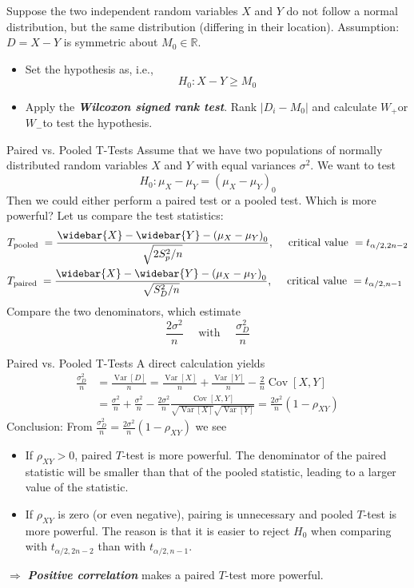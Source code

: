 \documentclass{beamer}
\newcommand{\bb}[1]{\textcolor{antiquefuchsia}{\textbf{\textit{#1}}}}
\begin{document}
\begin{frame}
Suppose the two independent random variables $X$ and $Y$ do not follow a normal distribution, but the same distribution (differing in their location).
Assumption: $D=X-Y$ is symmetric about $M_{0} \in \mathbb{R}$.
\begin{itemize}
\item Set the hypothesis as, i.e.,
$$
H_{0}: X-Y \geq M_{0}
$$
\item Apply the \bb{Wilcoxon signed rank test}. Rank $\left|D_{i}-M_{0}\right|$ and calculate $W_{+}$or $W_{-}$to test the hypothesis.
\end{itemize}
\end{frame}

\begin{frame}{Paired vs. Pooled T-Tests}
Assume that we have two populations of normally distributed random variables $X$ and $Y$ with equal variances $\sigma^{2}$. We want to test
$$
H_{0}: \mu_{X}-\mu_{Y}=\left(\mu_{X}-\mu_{Y}\right)_{0}
$$
Then we could either perform a paired test or a pooled test.
Which is more powerful? Let us compare the test statistics:
$$
\begin{aligned}
&T_{\text {pooled }}=\frac{\widebar{X}-\widebar{Y}-\left(\mu_{X}-\mu_{Y}\right)_{0}}{\sqrt{2 S_{p}^{2} / n}}, \quad \text { critical value }=t_{\alpha / 2,2 n-2} \\
&T_{\text {paired }}=\frac{\widebar{X}-\widebar{Y}-\left(\mu_{X}-\mu_{Y}\right)_{0}}{\sqrt{S_{D}^{2} / n}}, \quad \text { critical value }=t_{\alpha / 2, n-1}
\end{aligned}
$$
Compare the two denominators, which estimate
$$
\frac{2 \sigma^{2}}{n} \quad \text { with } \quad \frac{\sigma_{D}^{2}}{n}
$$
\end{frame}

\begin{frame}{Paired vs. Pooled T-Tests}
A direct calculation yields
$$
\begin{aligned}
\frac{\sigma_{D}^{2}}{n} &=\frac{\operatorname{Var}[D]}{n}=\frac{\operatorname{Var}[X]}{n}+\frac{\operatorname{Var}[Y]}{n}-\frac{2}{n} \operatorname{Cov}[X, Y] \\
&=\frac{\sigma^{2}}{n}+\frac{\sigma^{2}}{n}-\frac{2 \sigma^{2}}{n} \frac{\operatorname{Cov}[X, Y]}{\sqrt{\operatorname{Var}[X]} \sqrt{\operatorname{Var}[Y]}} =\frac{2 \sigma^{2}}{n}\left(1-\rho_{X Y}\right)
\end{aligned}
$$
Conclusion: From
$
\frac{\sigma_{D}^{2}}{n}=\frac{2 \sigma^{2}}{n}\left(1-\rho_{X Y}\right)
$
we see
\begin{itemize}
\item If $\rho_{X Y}>0$, paired $T$-test is more powerful. The denominator of the paired statistic will be smaller than that of the pooled statistic, leading to a larger value of the statistic.
\item If $\rho_{X Y}$ is zero (or even negative), pairing is unnecessary and pooled $T$-test is more powerful. The reason is that it is easier to reject $H_{0}$ when comparing with $t_{\alpha / 2,2 n-2}$ than with $t_{\alpha / 2, n-1}$.
\end{itemize}
$\Rightarrow$ \bb{Positive correlation} makes a paired $T$-test more powerful.
\end{frame}
\end{document}
